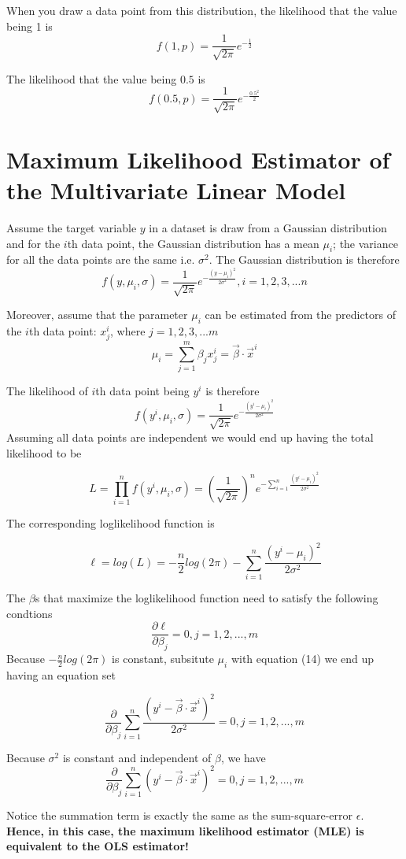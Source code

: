 \documentclass[12pt, oneside]{article}
\begin{document}
When you draw a data point from this distribution, the likelihood that the value being 1 is 
$$f(1, p)=\frac{1}{\sqrt{2\pi}}e^{-\frac{1}{2}}$$

The likelihood that the value being $0.5$ is 
$$f(0.5, p)=\frac{1}{\sqrt{2\pi}}e^{-\frac{0.5^2}{2}}$$


\section{Maximum Likelihood Estimator of the Multivariate Linear Model}
Assume the target variable $y$ in a dataset is draw from a Gaussian distribution and for the $i$th data point, the Gaussian distribution has a mean $\mu_i$; the variance for all the data points are the same i.e. $\sigma^2$. The Gaussian distribution is therefore
$$f(y, \mu_i, \sigma)=\frac{1}{\sqrt{2\pi}}e^{-\frac{(y-\mu_i)^2}{2\sigma^2}}, i=1, 2, 3, ...n $$

Moreover, assume that the parameter $\mu_i$ can be estimated from the predictors of the $i$th data point: $x_j^i$, where $j=1, 2, 3, ...m$  
\begin{equation}
\mu_i=\sum\limits_{j=1}^{m}\beta_j x_j^i=\vec{\beta}\cdot\vec{x}^i
\end{equation}

The likelihood of $i$th data point being $y^i$ is therefore
$$f(y^i, \mu_i, \sigma)=\frac{1}{\sqrt{2\pi}}e^{-\frac{(y^i-\mu_i)^2}{2\sigma^2}}$$
Assuming all data points are independent we would end up having the total likelihood to be

$$
L=\prod_{i=1}^n f(y^i, \mu_i, \sigma)=(\frac{1}{\sqrt{2\pi}})^n e^{-\sum\limits_{i=1}^n\frac{(y^i-\mu_i)^2}{2\sigma^2}}
$$

The corresponding loglikelihood function is 

$$
\ell=log(L)=-\frac{n}{2}log(2\pi)-\sum\limits_{i=1}^n\frac{(y^i-\mu_i)^2}{2\sigma^2}
$$

The $\beta$s that maximize the loglikelihood function need to satisfy the following condtions
$$
\frac{\partial \ell}{\partial \beta_j}=0, j=1, 2, ..., m
$$
Because $-\frac{n}{2}log(2\pi)$ is constant, subsitute $\mu_i$ with equation (14) we end up having an equation set 

$$\frac{\partial}{\partial \beta_j}\sum\limits_{i=1}^n\frac{(y^i-\vec{\beta}\cdot\vec{x}^i)^2}{2\sigma^2}=0, j=1, 2, ..., m$$

Because $\sigma^2$ is constant and independent of $\beta$, we have 
$$\frac{\partial}{\partial \beta_j}\sum\limits_{i=1}^n {(y^i-\vec{\beta}\cdot\vec{x}^i)^2}=0, j=1, 2, ..., m$$

Notice the summation term is exactly the same as the sum-square-error $\epsilon$. \bf {Hence, in this case, the maximum likelihood estimator (MLE) is equivalent to the OLS estimator!} 
\end{document}
